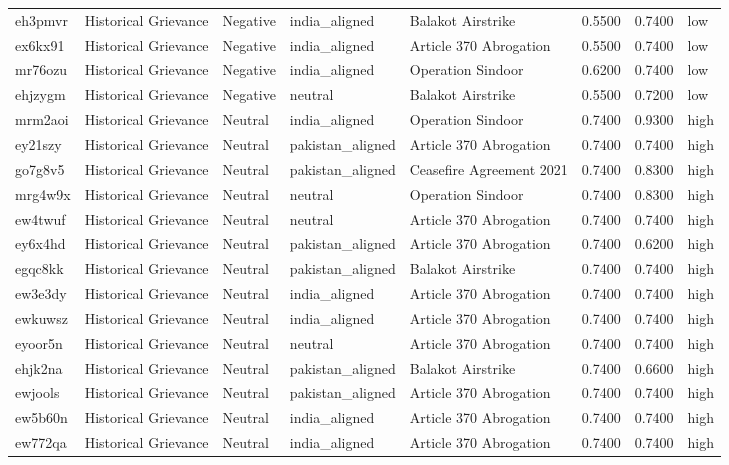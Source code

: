 \begin{longtable}{lllllrrl}
eh3pmvr & Historical Grievance & Negative & india\_aligned & Balakot Airstrike & 0.5500 & 0.7400 & low \\
ex6kx91 & Historical Grievance & Negative & india\_aligned & Article 370 Abrogation & 0.5500 & 0.7400 & low \\
mr76ozu & Historical Grievance & Negative & india\_aligned & Operation Sindoor & 0.6200 & 0.7400 & low \\
ehjzygm & Historical Grievance & Negative & neutral & Balakot Airstrike & 0.5500 & 0.7200 & low \\
mrm2aoi & Historical Grievance & Neutral & india\_aligned & Operation Sindoor & 0.7400 & 0.9300 & high \\
ey21szy & Historical Grievance & Neutral & pakistan\_aligned & Article 370 Abrogation & 0.7400 & 0.7400 & high \\
go7g8v5 & Historical Grievance & Neutral & pakistan\_aligned & Ceasefire Agreement 2021 & 0.7400 & 0.8300 & high \\
mrg4w9x & Historical Grievance & Neutral & neutral & Operation Sindoor & 0.7400 & 0.8300 & high \\
ew4twuf & Historical Grievance & Neutral & neutral & Article 370 Abrogation & 0.7400 & 0.7400 & high \\
ey6x4hd & Historical Grievance & Neutral & pakistan\_aligned & Article 370 Abrogation & 0.7400 & 0.6200 & high \\
egqc8kk & Historical Grievance & Neutral & pakistan\_aligned & Balakot Airstrike & 0.7400 & 0.7400 & high \\
ew3e3dy & Historical Grievance & Neutral & india\_aligned & Article 370 Abrogation & 0.7400 & 0.7400 & high \\
ewkuwsz & Historical Grievance & Neutral & india\_aligned & Article 370 Abrogation & 0.7400 & 0.7400 & high \\
eyoor5n & Historical Grievance & Neutral & neutral & Article 370 Abrogation & 0.7400 & 0.7400 & high \\
ehjk2na & Historical Grievance & Neutral & pakistan\_aligned & Balakot Airstrike & 0.7400 & 0.6600 & high \\
ewjools & Historical Grievance & Neutral & pakistan\_aligned & Article 370 Abrogation & 0.7400 & 0.7400 & high \\
ew5b60n & Historical Grievance & Neutral & india\_aligned & Article 370 Abrogation & 0.7400 & 0.7400 & high \\
ew772qa & Historical Grievance & Neutral & india\_aligned & Article 370 Abrogation & 0.7400 & 0.7400 & high \\

\end{longtable}
